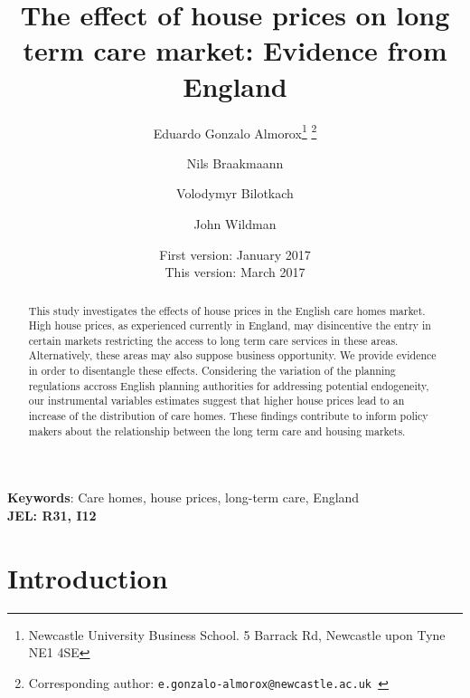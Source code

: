 \documentclass[12pt,letterpaper]{article}
\begin{document}
\title{\LARGE{The effect of house prices on long term care market: Evidence from England}}
\author{Eduardo Gonzalo Almorox\thanks{Newcastle University Business School. 5 Barrack Rd, Newcastle upon Tyne NE1 4SE} \thanks{Corresponding author: \tt{e.gonzalo-almorox@newcastle.ac.uk} } \and Nils Braakmaann\footnotemark[2]
 \and Volodymyr Bilotkach\footnotemark[2] \and John Wildman\footnotemark[2]}


\date{First version: January 2017\\ This version: March 2017}
\maketitle

\begin{abstract}
This study investigates the effects of house prices in the English care homes market. 
High house prices, as experienced currently in England, may disincentive the entry in
 certain markets restricting the access to long term care services in these areas. Alternatively, 
 these areas may also suppose business opportunity. We provide evidence in order to disentangle 
 these effects. Considering the variation of the planning regulations accross English planning authorities for addressing
 potential endogeneity, our instrumental variables estimates suggest that higher house prices lead to an increase of the distribution of care homes. 
 These findings contribute to inform policy makers about the relationship between the long term care and housing markets. 
\end{abstract}

{{\bf{Keywords}}: Care homes, house prices, long-term care, England\\
\bf{JEL}: R31, I12}

\newpage
\tableofcontents


\newpage
\section{Introduction}
\label{sec: intro}
\end{document}
